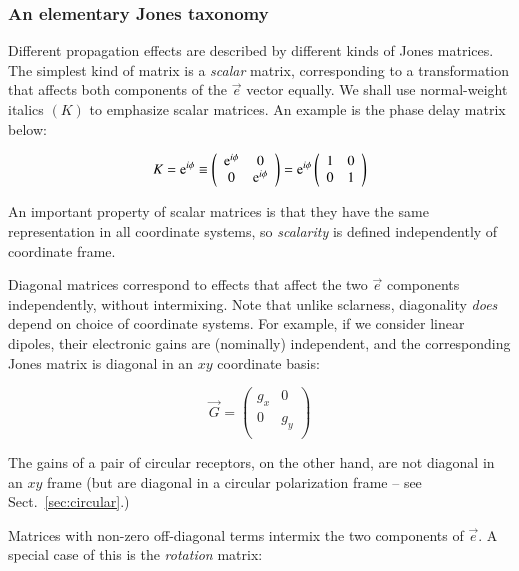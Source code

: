 \documentclass[]{aa}
\newcommand{\jones}[2]{\vec {#1}_{#2}}
\begin{document}
\subsubsection{An elementary Jones taxonomy\label{sec:taxonomy}}

Different propagation effects are described by different kinds of Jones matrices. The simplest kind of matrix is a {\em scalar} matrix, corresponding to a transformation that affects both components of the $\vec e$ vector equally. We shall use normal-weight italics $(K)$ to emphasize scalar matrices. An example is the phase delay matrix below:

    \[
    K = {\rm e}^{i\phi} \equiv 
    \left( 
    \begin{array}{cc}
    {\rm e}^{i\phi} & 0 \\
    0 & {\rm e}^{i\phi} \\
    \end{array}
    \right) =   
    {\rm e}^{i\phi} \left( 
    \begin{array}{cc}
    1 & 0 \\
    0 & 1 \\
    \end{array}
    \right)    
    \]

An important property of scalar matrices is that they have the same representation in all coordinate systems, so {\em scalarity} is defined independently of coordinate frame.

Diagonal matrices correspond to effects that affect the two $\vec e$ components independently, without intermixing. Note that unlike sclarness, diagonality {\em does} depend on choice of coordinate systems. For example, if we consider linear dipoles, their electronic gains are (nominally) independent, and the corresponding Jones matrix is diagonal in an $xy$ coordinate basis:

    \[
    \jones{G}{} = 
    \left( 
    \begin{array}{cc}
    g_x & 0 \\
    0 & g_y \\
    \end{array}
    \right) 
    \]

The gains of a pair of circular receptors, on the other hand, are not diagonal in an $xy$ frame (but are diagonal in a circular polarization frame -- see Sect.~\ref{sec:circular}.)

Matrices with non-zero off-diagonal terms intermix the two components of $\vec e$. A special case of this is the {\em rotation} matrix:
\end{document}
